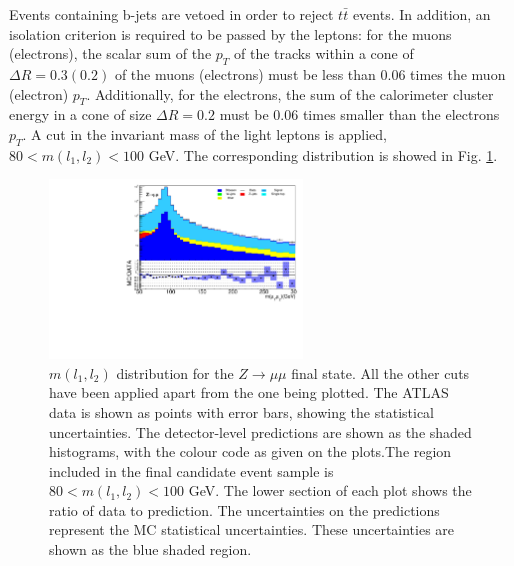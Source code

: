 Events containing b-jets are vetoed in order to reject $t\bar{t}$ events. In addition, an isolation criterion is required to be passed by the leptons: for the muons (electrons), the scalar sum of the $p_T$ of the tracks within a cone of $\Delta R=0.3 (0.2)$ of the muons (electrons) must be less than 0.06 times the muon (electron) $p_T$. Additionally, for the electrons, the sum of the calorimeter cluster energy in a cone of size $\Delta R=0.2$ must be 0.06 times smaller than the electrons $p_T$. A cut in the invariant mass of the light leptons is applied, $80<m(l_1,l_2)<100$ GeV. The corresponding distribution is showed in Fig. \ref{Fig7s}.

\begin{figure}[htbp]
	\centering
	\includegraphics[width=0.6\textwidth]{figures/Fig7.pdf}
	\caption{$m(l_1,l_2)$ distribution for the $Z\to\mu\mu$ final state. All the other cuts have been applied apart from the one being plotted. The ATLAS data is shown as points with error bars, showing the statistical uncertainties. The detector-level predictions are shown as the shaded histograms, with the colour code as given on the plots.The region included in the final candidate event sample is $80<m(l_1,l_2)<100$ GeV. The lower section of each plot shows the ratio of data to prediction. The uncertainties on the predictions represent the MC statistical uncertainties. These uncertainties are shown as the blue shaded region.}
	\label{Fig7s}
\end{figure}

